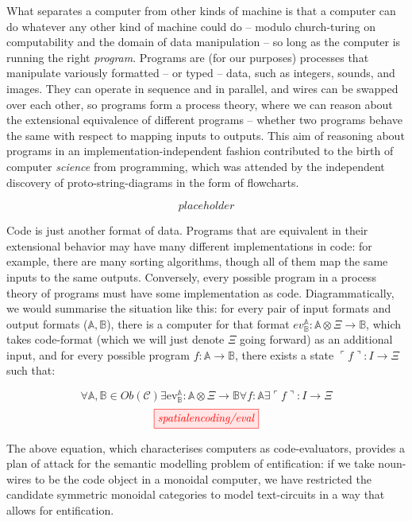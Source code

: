  What separates a computer from other kinds of machine is that a computer can do whatever any other kind of machine could do -- modulo church-turing on computability and the domain of data manipulation -- so long as the computer is running the right \emph{program}. Programs are (for our purposes) processes that manipulate variously formatted -- or typed -- data, such as integers, sounds, and images. They can operate in sequence and in parallel, and wires can be swapped over each other, so programs form a process theory, where we can reason about the extensional equivalence of different programs -- whether two programs behave the same with respect to mapping inputs to outputs. This aim of reasoning about programs in an implementation-independent fashion contributed to the birth of computer \emph{science} from programming, which was attended by the independent discovery of proto-string-diagrams in the form of flowcharts.

\[placeholder\]

 Code is just another format of data. Programs that are equivalent in their extensional behavior may have many different implementations in code: for example, there are many sorting algorithms, though all of them map the same inputs to the same outputs. Conversely, every possible program in a process theory of programs must have some implementation as code. Diagrammatically, we would summarise the situation like this: for every pair of input formats and output formats ($\mathbb{A},\mathbb{B}$), there is a computer for that format $ev^{\mathbb{A}}_{\mathbb{B}}: \mathbb{A} \otimes \Xi \rightarrow \mathbb{B}$, which takes code-format (which we will just denote $\Xi$ going forward) as an additional input, and for every possible program $f: \mathbb{A} \rightarrow \mathbb{B}$, there exists a state $\ulcorner f \urcorner : I \rightarrow \Xi$ such that:

\[
\forall \mathbb{A},\mathbb{B} \in Ob(\mathcal{C}) \exists \text{ev}^{ \mathbb{A}}_{\mathbb{B}}: \mathbb{A} \otimes \Xi \rightarrow \mathbb{B} \forall f : \mathbb{A} \exists \ulcorner f \urcorner : I \rightarrow \Xi\]
\[
\tikzfig{spatialencoding/eval}
\]

The above equation, which characterises computers as code-evaluators, provides a plan of attack for the semantic modelling problem of entification: if we take noun-wires to be the code object in a monoidal computer, we have restricted the candidate symmetric monoidal categories to model text-circuits in a way that allows for entification.

